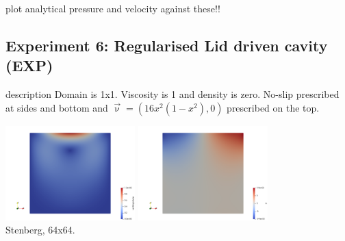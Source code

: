 plot analytical pressure and velocity against these!!




\newpage
\subsection*{Experiment 6: Regularised Lid driven cavity (EXP)}

{\color{red} description}
Domain is 1x1. Viscosity is 1 and density is zero. 
No-slip prescribed at sides and bottom and $\vec{\upnu}=(16x^2(1-x^2),0)$ prescribed on the top.

\begin{center}
\includegraphics[width=5cm]{python_codes/fieldstone_78/results/exp06/vel}
\includegraphics[width=5cm]{python_codes/fieldstone_78/results/exp06/p}\\
{\captionfont Stenberg, 64x64.}
\end{center}

